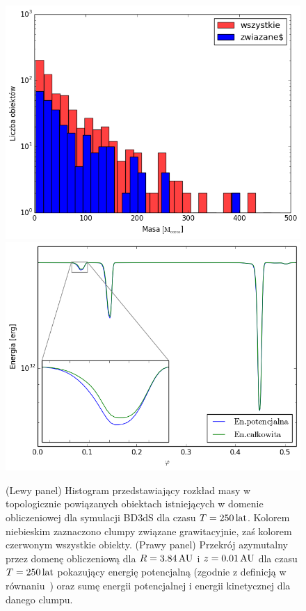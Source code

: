 \begin{figure}
   \centering
   \includegraphics[width=0.49\linewidth]{figures/masshist.png}
   \includegraphics[width=0.49\linewidth]{figures/energie.png}
   \caption{(Lewy panel) Histogram przedstawiający rozkład masy w topologicznie powiązanych
   obiektach istniejących w domenie obliczeniowej dla symulacji BD3dS dla czasu
   $T=250\hbox{$\thinspace\textrm{lat}$}$. Kolorem niebieskim zaznaczono clumpy związane grawitacyjnie, zaś
   kolorem czerwonym wszystkie obiekty.
   (Prawy panel) Przekrój azymutalny przez domenę obliczeniową dla $R=3.84\hbox{$\thinspace\textrm{AU}$}$
   i $z=0.01\hbox{$\thinspace\textrm{AU}$}$ dla czasu $T=250\hbox{$\thinspace\textrm{lat}$}$ pokazujący energię potencjalną (zgodnie z
   definicją w równaniu~) oraz sumę energii potencjalnej i energii
   kinetycznej dla danego clumpu.}
   \label{fig:masshist}
\end{figure}
%
